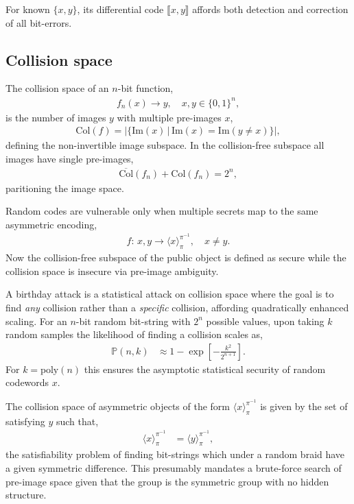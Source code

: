 \documentclass[twocolumn, aps, amsmath, amssymb, nofootinbib, superscriptaddress, longbibliography, doublefloatfix, table-of-contents, eqsecnum, rmp]{revtex4-2}
\def\diff#1#2{\llbracket #1,#2\rrbracket}
\def\selfbraid#1#2#3{\langle#1\rangle_{#2}^{#3}}
\begin{document}
For known $\{x,y\}$, its differential code $\diff{x}{y}$ affords both detection and correction of all bit-errors.

\subsection{Collision space}

The collision space of an $n$-bit function,
\begin{align}
	f_n(x) \to y,\quad x,y\in\{0,1\}^n,
\end{align}
is the number of images $y$ with multiple pre-images $x$,
\begin{align}
	\mathrm{Col}(f) = |\{\mathrm{Im}(x)\,|\,\mathrm{Im}(x)=\mathrm{Im}(y\neq x)\}|,
\end{align}
defining the non-invertible image subspace. In the collision-free subspace all images have single pre-images,
\begin{align}
	\overline{\mathrm{Col}}(f_n) + \mathrm{Col}(f_n) = 2^n,
\end{align}
paritioning the image space.

Random codes are vulnerable only when multiple secrets map to the same asymmetric encoding,
\begin{align}
	f:\, x,y \to \selfbraid{x}{\pi}{\pi^{-1}},\quad x\neq y.
\end{align}
Now the collision-free subspace of the public object is defined as secure while the collision space is insecure via pre-image ambiguity.

A birthday attack is a statistical attack on collision space where the goal is to find \emph{any} collision rather than a \emph{specific} collision, affording quadratically enhanced scaling. For an $n$-bit random bit-string with $2^n$ possible values, upon taking $k$ random samples the likelihood of finding a collision scales as,
\begin{align}
	\mathbb{P}(n,k) &\approx 1 - \exp\left[-\frac{k^2}{2^{n+1}}\right].
\end{align}
For $k=\mathrm{poly}(n)$ this ensures the asymptotic statistical security of random codewords $x$.

The collision space of asymmetric objects of the form $\selfbraid{x}{\pi}{\pi^{-1}}$ is given by the set of satisfying $y$ such that,
\begin{align}
	\selfbraid{x}{\pi}{\pi^{-1}} &= \selfbraid{y}{\pi}{\pi^{-1}},
\end{align}
the satisfiability problem of finding bit-strings which under a random braid have a given symmetric difference. This presumably mandates a brute-force search of pre-image space given that the group is the symmetric group with no hidden structure.
\end{document}

